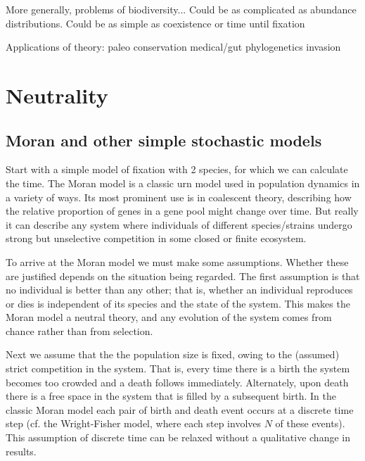 \documentclass[a4paper,11pt]{article}
\numberwithin{equation}{section} %
\begin{document}
More generally, problems of biodiversity...
Could be as complicated as abundance distributions. 
Could be as simple as coexistence or time until fixation

Applications of theory:
paleo
conservation
medical/gut
phylogenetics
invasion%








\section{Neutrality}
\subsection{Moran and other simple stochastic models}
Start with a simple model of fixation with 2 species, for which we can calculate the time. 
The Moran model \cite{Moran1962} is a classic urn model used in population dynamics in a variety of ways. 
Its most prominent use is in coalescent theory, describing how the relative proportion of genes in a gene pool might change over time. 
But really it can describe any system where individuals of different species/strains undergo strong but unselective competition in some closed or finite ecosystem. 

To arrive at the Moran model we must make some assumptions. 
Whether these are justified depends on the situation being regarded. 
The first assumption is that no individual is better than any other; that is, whether an individual reproduces or dies is independent of its species and the state of the system. 
This makes the Moran model a neutral theory, and any evolution of the system comes from chance rather than from selection. 

Next we assume that the the population size is fixed, owing to the (assumed) strict competition in the system. 
That is, every time there is a birth the system becomes too crowded and a death follows immediately. Alternately, upon death there is a free space in the system that is filled by a subsequent birth. 
In the classic Moran model each pair of birth and death event occurs at a discrete time step (cf. the Wright-Fisher model, where each step involves $N$ of these events). 
This assumption of discrete time can be relaxed without a qualitative change in results. 
\end{document}
